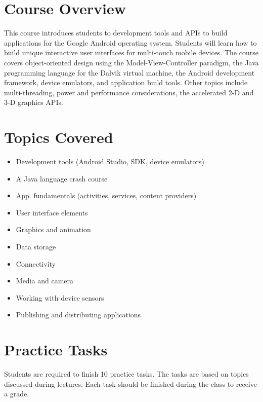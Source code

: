 \documentclass[12pt,a4paper,oneside]{article}
\begin{document}
    \section{Course Overview}

        This course introduces students to development tools and APIs to build
        applications for the Google Android operating system. Students will
        learn how to build unique interactive user interfaces for multi-touch
        mobile devices. The course covers object-oriented design using the
        Model-View-Controller paradigm, the Java programming language for the
        Dalvik virtual machine, the Android development framework, device
        emulators, and application build tools. Other topics include
        multi-threading, power and performance considerations, the accelerated
        2-D and 3-D graphics APIs.

    \section{Topics Covered}

        \begin{itemize}
            \item Development tools (Android Studio, SDK, device emulators)
            \item A Java language crash course
            \item App. fundamentals (activities, services, content providers)
            \item User interface elements
            \item Graphics and animation
            \item Data storage
            \item Connectivity
            \item Media and camera
            \item Working with device sensors
            \item Publishing and distributing applications
        \end{itemize}

    \section{Practice Tasks}

        Students are required to finish 10 practice tasks. The tasks are based
        on topics discussed during lectures. Each task should be finished during
        the class to receive a grade.
\end{document}
